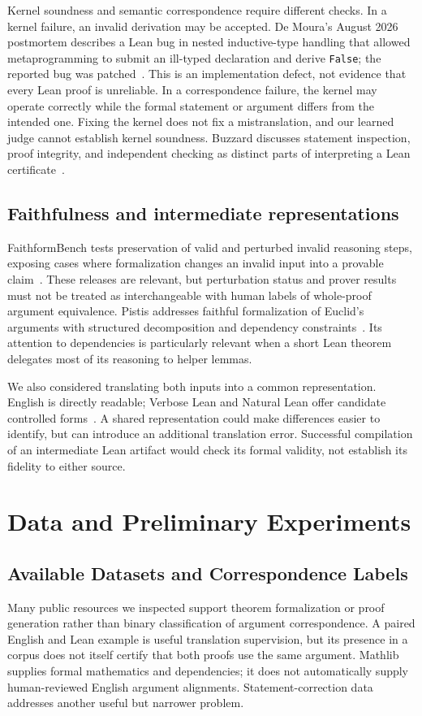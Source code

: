 \documentclass[sigconf,nonacm]{acmart}
\begin{document}
Kernel soundness and semantic correspondence require different checks. In a kernel failure, an invalid derivation may be accepted. De Moura's August 2026 postmortem describes a Lean bug in nested inductive-type handling that allowed metaprogramming to submit an ill-typed declaration and derive \texttt{False}; the reported bug was patched~\cite{leanbug}. This is an implementation defect, not evidence that every Lean proof is unreliable. In a correspondence failure, the kernel may operate correctly while the formal statement or argument differs from the intended one. Fixing the kernel does not fix a mistranslation, and our learned judge cannot establish kernel soundness. Buzzard discusses statement inspection, proof integrity, and independent checking as distinct parts of interpreting a Lean certificate~\cite{xena}.

\subsection{Faithfulness and intermediate representations}
FaithformBench tests preservation of valid and perturbed invalid reasoning steps, exposing cases where formalization changes an invalid input into a provable claim~\cite{faithform}. These releases are relevant, but perturbation status and prover results must not be treated as interchangeable with human labels of whole-proof argument equivalence. Pistis addresses faithful formalization of Euclid's arguments with structured decomposition and dependency constraints~\cite{pistis}. Its attention to dependencies is particularly relevant when a short Lean theorem delegates most of its reasoning to helper lemmas.

We also considered translating both inputs into a common representation. English is directly readable; Verbose Lean and Natural Lean offer candidate controlled forms~\cite{verboselean,naturallean}. A shared representation could make differences easier to identify, but can introduce an additional translation error. Successful compilation of an intermediate Lean artifact would check its formal validity, not establish its fidelity to either source.

\section{Data and Preliminary Experiments}
\subsection{Available Datasets and Correspondence Labels}
Many public resources we inspected support theorem formalization or proof generation rather than binary classification of argument correspondence. A paired English and Lean example is useful translation supervision, but its presence in a corpus does not itself certify that both proofs use the same argument. Mathlib supplies formal mathematics and dependencies; it does not automatically supply human-reviewed English argument alignments. Statement-correction data addresses another useful but narrower problem.
\end{document}
